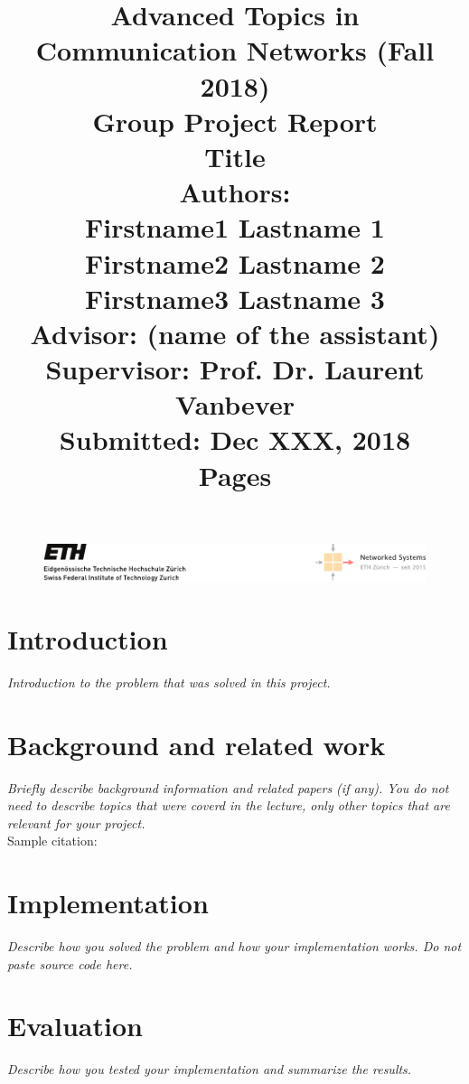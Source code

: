 \documentclass[11pt,oneside,a4paper]{article}
\title{
    \vspace*{0.0mm}
    \LARGE\bf\sf Advanced Topics in \\Communication Networks (Fall 2018)
    \vspace*{10.0mm} \\
    \Large\bf\sf Group Project Report \vspace*{30.0mm}\\
    \Huge\bf\sf Title
    \vspace*{30.0mm} \\
    \normalsize
    \sf Authors:\\[5pt]
    \sf Firstname1 Lastname 1 \\ [5pt]
    \sf Firstname2 Lastname 2 \\ [5pt]
    \sf Firstname3 Lastname 3 \vspace*{5mm}\\
    \sf  Advisor:  (name of the assistant) \vspace*{5mm}\\
    \sf  Supervisor:  Prof. Dr. Laurent Vanbever \vspace*{20.0mm}\\
    \sf Submitted: Dec XXX, 2018\\ [5pt]
    \sf \pageref{lastpage} Pages
}
\date{}
\newcommand{\hint}[1]{{\color{blue} \em #1}}
\begin{document}
\begin{figure}
    \includegraphics[width=\textwidth]{figures/eth-nsg-header}
\end{figure}

\maketitle
\thispagestyle{empty}
\raggedbottom
\clearpage


\begin{abstract}
    \lipsum[1-3]
\end{abstract}

\clearpage
\setcounter{tocdepth}{2}
\tableofcontents
\clearpage
{}

\section{Introduction}
\hint{Introduction to the problem that was solved in this project.} \\
\lipsum[1-2]

\section{Background and related work}
\hint{Briefly describe background information and related papers (if any). You do not need to describe topics that were coverd in the lecture, only other topics that are relevant for your project.} \\
\lipsum[1-2]
Sample citation: \cite{bosshart2014p4}

\section{Implementation}
\hint{Describe how you solved the problem and how your implementation works. Do not paste source code here.} \\
\lipsum[1-5]

\section{Evaluation}
\hint{Describe how you tested your implementation and summarize the results.} \\
\lipsum[1-2]
\end{document}

